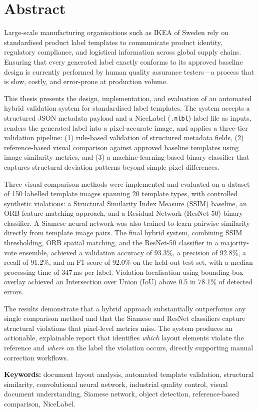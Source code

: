 \chapter*{Abstract}

Large-scale manufacturing organisations such as IKEA of Sweden rely on standardised
product label templates to communicate product identity, regulatory compliance, and
logistical information across global supply chains. Ensuring that every generated label
exactly conforms to its approved baseline design is currently performed by human quality
assurance testers—a process that is slow, costly, and error-prone at production volume.

This thesis presents the design, implementation, and evaluation of an automated hybrid
validation system for standardised label templates. The system accepts a structured
JSON metadata payload and a NiceLabel (\texttt{.nlbl}) label file as inputs, renders the
generated label into a pixel-accurate image, and applies a three-tier validation pipeline:
(1) rule-based validation of structured metadata fields, (2) reference-based visual
comparison against approved baseline templates using image similarity metrics, and (3) a
machine-learning-based binary classifier that captures structural deviation patterns
beyond simple pixel differences.

Three visual comparison methods were implemented and evaluated on a dataset of 150
labelled template images spanning 20 template types, with controlled synthetic violations:
a Structural Similarity Index Measure (SSIM) baseline, an ORB feature-matching approach,
and a Residual Network (ResNet-50) binary classifier. A Siamese neural network was also
trained to learn pairwise similarity directly from template image pairs. The final hybrid
system, combining SSIM thresholding, ORB spatial matching, and the ResNet-50 classifier
in a majority-vote ensemble, achieved a validation accuracy of 93.3\%, a precision of
92.8\%, a recall of 91.2\%, and an F1-score of 92.0\% on the held-out test set, with a
median processing time of 347\,ms per label. Violation localisation using bounding-box
overlay achieved an Intersection over Union (IoU) above 0.5 in 78.1\% of detected errors.

The results demonstrate that a hybrid approach substantially outperforms any single
comparison method and that the Siamese and ResNet classifiers capture structural
violations that pixel-level metrics miss. The system produces an actionable, explainable
report that identifies \emph{which} layout elements violate the reference and \emph{where}
on the label the violation occurs, directly supporting manual correction workflows.

\vspace{0.8em}
\noindent\textbf{Keywords:}
document layout analysis, automated template validation, structural similarity,
convolutional neural network, industrial quality control, visual document understanding,
Siamese network, object detection, reference-based comparison, NiceLabel.
\clearpage

